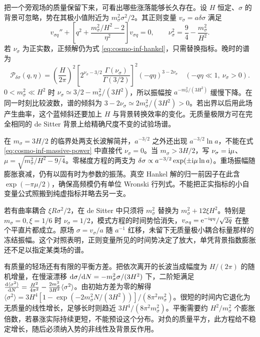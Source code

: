 把一个旁观场的质量保留下来，可看出哪些涨落能够长久存在。设 $H$ 恒定、$\sigma$ 的背景可忽略，势在其极小值附近为 $m_\sigma^2\sigma^2/2$。其正则变量 $v_\sigma=a\delta\sigma$ 满足
\[
 v_{\sigma q}''+
 \left[q^2+\frac{m_\sigma^2/H^2-2}{\eta^2}\right]v_{\sigma q}=0,\qquad
 \nu_\sigma^2=\frac94-\frac{m_\sigma^2}{H^2}.
\]
若 $\nu_\sigma$ 为正实数，正频解仍为式 \eqref{eq:cosmo-inf-hankel}，只需替换指标。晚时的谱为
\begin{equation}\label{eq:cosmo-inf-massive-power}
 \mathcal P_{\delta\sigma}(q,\eta)
 =\left(\frac{H}{2\pi}\right)^2
 \left[2^{\nu_\sigma-3/2}
       \frac{\Gamma(\nu_\sigma)}{\Gamma(3/2)}\right]^2
 (-q\eta)^{3-2\nu_\sigma}
 \quad(-q\eta\ll1,\ \nu_\sigma>0).
\end{equation}
$0<m_\sigma^2\ll H^2$ 时 $\nu_\sigma\simeq3/2-m_\sigma^2/(3H^2)$，所以振幅按 $a^{-m_\sigma^2/(3H^2)}$ 缓慢下降。在同一时刻比较波数，谱的倾斜为 $3-2\nu_\sigma\simeq2m_\sigma^2/(3H^2)>0$。若出界以后用此场产生曲率，这个蓝倾斜还要加上 $H$ 与背景转换效率的变化。无质量极限方可在完全相同的 de Sitter 背景上给精确尺度不变的试验场谱。

在 $m_\sigma=3H/2$ 的临界处两支长波解简并，$a^{-3/2}$ 之外还出现 $a^{-3/2}\ln a$，不能在式 \eqref{eq:cosmo-inf-massive-power} 中直接代 $\nu_\sigma=0$。当 $m_\sigma>3H/2$，写 $\nu_\sigma=\mathrm{i}\mu$、$\mu=\sqrt{m_\sigma^2/H^2-9/4}$。零梯度方程的两支为 $\delta\sigma\propto a^{-3/2}\exp(\pm\mathrm{i}\mu\ln a)$。重场振幅随膨胀衰减，仍有以固有时为参数的振荡。真空 Hankel 解的归一前因子在此含 $\exp(-\pi\mu/2)$，确保高频模仍有单位 Wronski 行列式。不能把正实指标的小自变量公式照搬到纯虚指标并略去另一支。

若有曲率耦合 $\xi R\sigma^2/2$，在 de Sitter 中只须将 $m_\sigma^2$ 替换为 $m_\sigma^2+12\xi H^2$。特别是 $m_\sigma=0,\xi=1/6$ 时 $\nu_\sigma=1/2$，模式方程的时间势恰消失，$v_{\sigma q}=\mathrm{e}^{-\mathrm{i} q\eta}/\sqrt{2q}$ 在整个平直片都成立。原场 $\sigma=v_\sigma/a$ 随 $a^{-1}$ 红移，未留下无质量极小耦合标量那样的冻结振幅。这个对照表明，正则变量所见的时间势决定了放大，单凭背景指数膨胀还不足以指定某类场的谱。

有质量的轻场还有有限的平衡方差。把依次离开的长波当成幅度为 $H/(2\pi)$ 的随机增量，在慢滚漂移 $\dd\sigma/\dd N=-m_\sigma^2\sigma/(3H^2)$ 下，二阶矩满足 $\frac{\dd\langle\sigma^2\rangle}{\dd N} =\frac{H^2}{4\pi^2}-\frac{2m_\sigma^2}{3H^2}\langle\sigma^2\rangle$。由初始方差为零的解得 $\langle\sigma^2\rangle=3H^4[1-\exp(-2m_\sigma^2N/(3H^2))]/(8\pi^2m_\sigma^2)$。很短的时间内它退化为无质量的线性增长，足够长时则趋近 $3H^4/(8\pi^2m_\sigma^2)$。平衡需要约 $H^2/m_\sigma^2$ 个膨胀倍数，若暴涨实际持续更短，不能预设这个分布。对负的质量平方，此方程给不稳定增长，随后必须纳入势的非线性及背景反作用。

